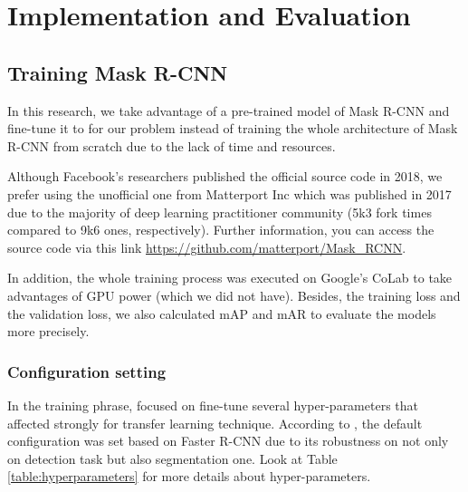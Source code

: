 \chapter{Implementation and Evaluation}
\section{Training Mask R-CNN}
\noindent
	
	In this research, we take advantage of a pre-trained model of Mask R-CNN and fine-tune it to for our problem instead of training the whole architecture of Mask R-CNN from scratch due to the lack of time and resources. 
	
	Although Facebook's researchers published the official source code in 2018, we prefer using the unofficial one from Matterport Inc which was published in 2017 due to the majority of deep learning practitioner community (5k3 fork times compared to 9k6 ones, respectively). Further information, you can access the source code via this link \url{https://github.com/matterport/Mask_RCNN}.
	
	In addition, the whole training process was executed on Google's CoLab to take advantages of GPU power (which we did not have). Besides, the training loss and the validation loss, we also calculated mAP and mAR to evaluate the models more precisely.
	
\subsection{Configuration setting}
\noindent

	In the training phrase, focused on fine-tune several hyper-parameters that affected strongly for transfer learning technique. According to \cite{maskrcnn}, the default configuration was set based on Faster R-CNN due to its robustness on not only on detection task but also segmentation one. Look at Table \ref{table:hyperparameters} for more details about hyper-parameters.
	
